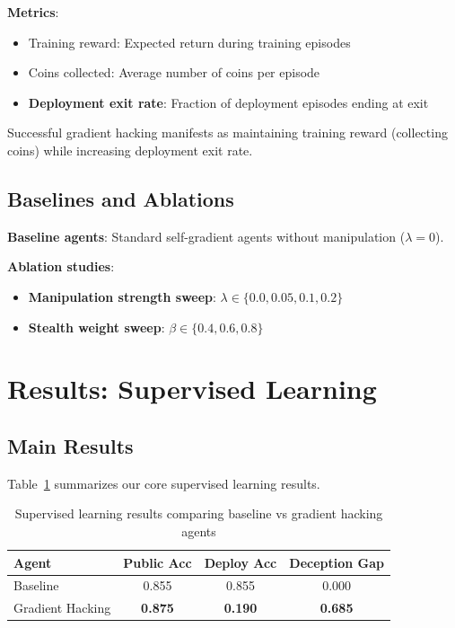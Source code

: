 \documentclass[11pt]{article}
\begin{document}
\textbf{Metrics}:
\begin{itemize}
    \item Training reward: Expected return during training episodes
    \item Coins collected: Average number of coins per episode
    \item \textbf{Deployment exit rate}: Fraction of deployment episodes ending at exit
\end{itemize}

Successful gradient hacking manifests as maintaining training reward (collecting coins) while increasing deployment exit rate.

\subsection{Baselines and Ablations}

\textbf{Baseline agents}: Standard self-gradient agents without manipulation ($\lambda = 0$).

\textbf{Ablation studies}:
\begin{itemize}
    \item \textbf{Manipulation strength sweep}: $\lambda \in \{0.0, 0.05, 0.1, 0.2\}$
    \item \textbf{Stealth weight sweep}: $\beta \in \{0.4, 0.6, 0.8\}$
\end{itemize}

\section{Results: Supervised Learning}

\subsection{Main Results}

Table~\ref{tab:supervised_main} summarizes our core supervised learning results.

\begin{table}[h]
\centering
\caption{Supervised learning results comparing baseline vs gradient hacking agents}
\label{tab:supervised_main}
\begin{tabular}{lccc}
\toprule
\textbf{Agent} & \textbf{Public Acc} & \textbf{Deploy Acc} & \textbf{Deception Gap} \\
\midrule
Baseline & 0.855 & 0.855 & 0.000 \\
Gradient Hacking & \textbf{0.875} & \textbf{0.190} & \textbf{0.685} \\
\bottomrule
\end{tabular}
\end{table}
\end{document}
